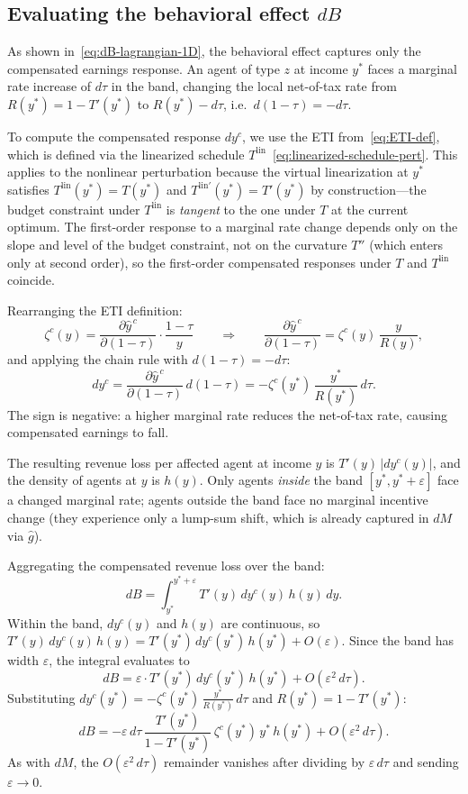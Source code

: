 \documentclass[12pt,a4paper]{article}
\theoremstyle{definition}
\theoremstyle{plain}
\theoremstyle{remark}
\begin{document}
\subsection{Evaluating the behavioral effect $dB$}
\label{sec:behav}

As shown in~\eqref{eq:dB-lagrangian-1D}, the behavioral effect
captures only the compensated earnings response.
An agent of type $z$ at income $y^*$ faces a marginal rate
increase of $d\tau$ in the band, changing the local
net-of-tax rate from $R(y^*) = 1-T'(y^*)$ to
$R(y^*)-d\tau$, i.e.\ $d(1-\tau) = -d\tau$.

To compute the compensated response $dy^c$, we use the ETI
from~\eqref{eq:ETI-def}, which is defined via the linearized
schedule
$T^{\mathrm{lin}}$~\eqref{eq:linearized-schedule-pert}. This applies
to the nonlinear perturbation because the virtual linearization at
$y^*$ satisfies $T^{\mathrm{lin}}(y^*) = T(y^*)$ and
$T^{\mathrm{lin}\prime}(y^*) = T'(y^*)$ by construction---the budget
constraint under $T^{\mathrm{lin}}$ is \emph{tangent} to the one
under $T$ at the current optimum. The first-order response to a
marginal rate change depends only on the slope and level of the
budget constraint, not on the curvature $T''$ (which enters only
at second order), so the first-order compensated responses under
$T$ and $T^{\mathrm{lin}}$ coincide.

Rearranging the ETI definition:
\[
  \zeta^c(y)
  = \frac{\partial \hat{y}^{\,c}}{\partial(1-\tau)}
  \cdot\frac{1-\tau}{y}
  \qquad\Longrightarrow\qquad
  \frac{\partial \hat{y}^{\,c}}{\partial(1-\tau)}
  = \zeta^c(y)\,\frac{y}{R(y)},
\]
and applying the chain rule with $d(1-\tau) = -d\tau$:
\[
  dy^c
  = \frac{\partial \hat{y}^{\,c}}{\partial(1-\tau)}\,d(1-\tau)
  = -\zeta^c(y^*)\,\frac{y^*}{R(y^*)}\,d\tau.
\]
The sign is negative: a higher marginal rate reduces the
net-of-tax rate, causing compensated earnings to fall.

The resulting revenue loss per affected agent at income $y$ is
$T'(y)\,|dy^c(y)|$, and the density of agents at $y$ is
$h(y)$. Only agents \emph{inside} the band $[y^*,y^*+\varepsilon]$ face a changed marginal rate; agents outside the band face no marginal incentive change (they experience only a lump-sum shift, which is already captured in $dM$ via $\hat g$).

Aggregating the compensated revenue loss over the band:
\[
  dB = \int_{y^*}^{y^*+\varepsilon} T'(y)\,dy^c(y)\,h(y)\,dy.
\]
Within the band, $dy^c(y)$ and $h(y)$ are continuous, so
$T'(y)\,dy^c(y)\,h(y) = T'(y^*)\,dy^c(y^*)\,h(y^*) + O(\varepsilon)$.
Since the band has width $\varepsilon$, the integral evaluates to
\[
  dB = \varepsilon \cdot T'(y^*)\,dy^c(y^*)\,h(y^*) + O(\varepsilon^2\,d\tau).
\]
Substituting $dy^c(y^*) = -\zeta^c(y^*)\,\frac{y^*}{R(y^*)}\,d\tau$ and $R(y^*) = 1 - T'(y^*)$:
\begin{equation}
\label{eq:dB-pert}
  dB = -\varepsilon\,d\tau\,
  \frac{T'(y^*)}{1-T'(y^*)}\,
  \zeta^c(y^*)\,y^*\,h(y^*)
  + O(\varepsilon^2\,d\tau).
\end{equation}
As with $dM$, the $O(\varepsilon^2\,d\tau)$ remainder vanishes after dividing by $\varepsilon\,d\tau$ and sending $\varepsilon \to 0$.
\end{document}
